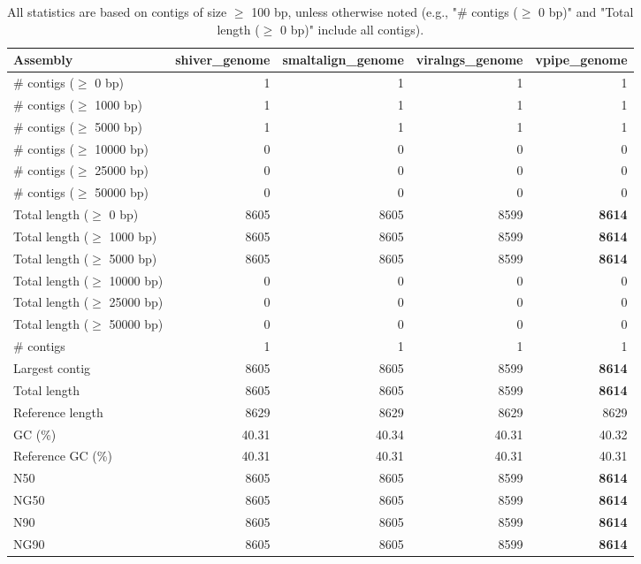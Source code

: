 \documentclass[12pt,a4paper]{article}
\begin{document}
\begin{table}[ht]
\begin{center}
\caption{All statistics are based on contigs of size $\geq$ 100 bp, unless otherwise noted (e.g., "\# contigs ($\geq$ 0 bp)" and "Total length ($\geq$ 0 bp)" include all contigs).}
\begin{tabular}{|l*{4}{|r}|}
\hline
Assembly & shiver\_genome & smaltalign\_genome & viralngs\_genome & vpipe\_genome \\ \hline
\# contigs ($\geq$ 0 bp) & 1 & 1 & 1 & 1 \\ \hline
\# contigs ($\geq$ 1000 bp) & 1 & 1 & 1 & 1 \\ \hline
\# contigs ($\geq$ 5000 bp) & 1 & 1 & 1 & 1 \\ \hline
\# contigs ($\geq$ 10000 bp) & 0 & 0 & 0 & 0 \\ \hline
\# contigs ($\geq$ 25000 bp) & 0 & 0 & 0 & 0 \\ \hline
\# contigs ($\geq$ 50000 bp) & 0 & 0 & 0 & 0 \\ \hline
Total length ($\geq$ 0 bp) & 8605 & 8605 & 8599 & {\bf 8614} \\ \hline
Total length ($\geq$ 1000 bp) & 8605 & 8605 & 8599 & {\bf 8614} \\ \hline
Total length ($\geq$ 5000 bp) & 8605 & 8605 & 8599 & {\bf 8614} \\ \hline
Total length ($\geq$ 10000 bp) & 0 & 0 & 0 & 0 \\ \hline
Total length ($\geq$ 25000 bp) & 0 & 0 & 0 & 0 \\ \hline
Total length ($\geq$ 50000 bp) & 0 & 0 & 0 & 0 \\ \hline
\# contigs & 1 & 1 & 1 & 1 \\ \hline
Largest contig & 8605 & 8605 & 8599 & {\bf 8614} \\ \hline
Total length & 8605 & 8605 & 8599 & {\bf 8614} \\ \hline
Reference length & 8629 & 8629 & 8629 & 8629 \\ \hline
GC (\%) & 40.31 & 40.34 & 40.31 & 40.32 \\ \hline
Reference GC (\%) & 40.31 & 40.31 & 40.31 & 40.31 \\ \hline
N50 & 8605 & 8605 & 8599 & {\bf 8614} \\ \hline
NG50 & 8605 & 8605 & 8599 & {\bf 8614} \\ \hline
N90 & 8605 & 8605 & 8599 & {\bf 8614} \\ \hline
NG90 & 8605 & 8605 & 8599 & {\bf 8614} \\ \hline

\end{tabular}
\end{center}
\end{table}
\end{document}
